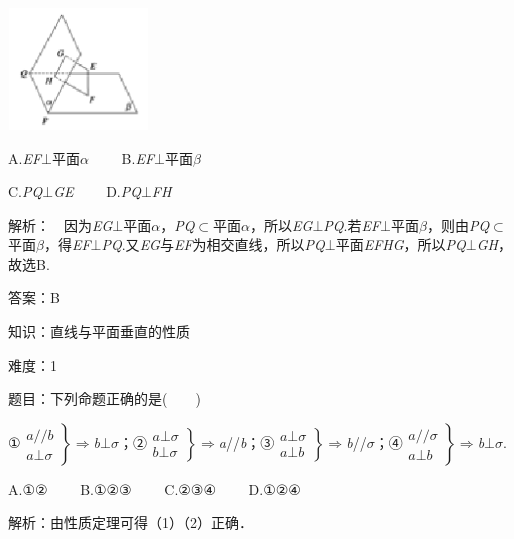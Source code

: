 \documentclass{article} %
\begin{document}
\includegraphics*[width=1.47in, height=1.27in, keepaspectratio=false]{image232}

A.\textit{EF}$\mathrm{\bot}$平面\textit{$\alpha$}　　  B.\textit{EF}$\mathrm{\bot}$平面\textit{$\beta$}

C.\textit{PQ}$\mathrm{\bot}$\textit{GE}　　  D.\textit{PQ}$\mathrm{\bot}$\textit{FH}

解析：　因为\textit{EG}$\mathrm{\bot}$平面\textit{$\alpha$}，\textit{PQ}$\mathrm{\subset }$平面\textit{$\alpha$}，所以\textit{EG}$\mathrm{\bot}$\textit{PQ}.若\textit{EF}$\mathrm{\bot}$平面\textit{$\beta$}，则由\textit{PQ}$\mathrm{\subset }$平面\textit{$\beta$}，得\textit{EF}$\mathrm{\bot}$\textit{PQ}.又\textit{EG}与\textit{EF}为相交直线，所以\textit{PQ}$\mathrm{\bot}$平面\textit{EFHG}，所以\textit{PQ}$\mathrm{\bot}$\textit{GH}，故选B.

答案：B

知识：直线与平面垂直的性质

难度：1

题目：下列命题正确的是(　　)

①$\left. \begin{array}{r}
a// b\\
a\bot \sigma
\end{array} \right\}\mathrm{\Rightarrow }$\textit{b}$\mathrm{\bot}$\textit{$\sigma$}；②$\left. \begin{array}{r}
a\bot \sigma\\
b\bot \sigma
\end{array} \right\}\mathrm{\Rightarrow }$\textit{a}//\textit{b}；③$\left. \begin{array}{r}
a\bot \sigma\\
a\bot b
\end{array} \right\}\mathrm{\Rightarrow }$\textit{b}//\textit{$\sigma$}；④$\left. \begin{array}{r}
a// \sigma\\
a\bot b
\end{array} \right\}\mathrm{\Rightarrow }$\textit{b}$\mathrm{\bot}$\textit{$\sigma$}.

A.①②　　 B.①②③　　 C.②③④　　 D.①②④

解析：由性质定理可得（1）（2）正确．
\end{document}
